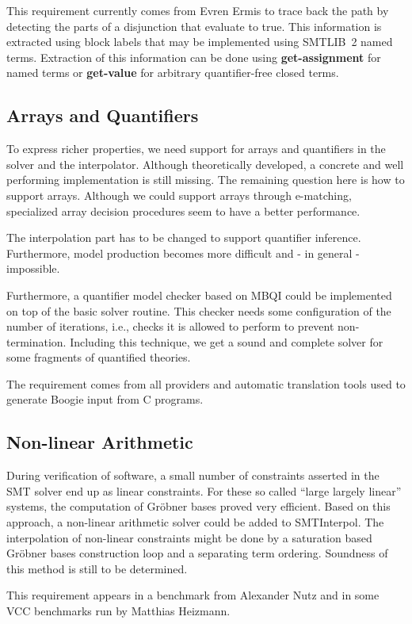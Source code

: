 \documentclass{article}
\newcommand\SI{SMTInterpol\xspace}
\begin{document}
This requirement currently comes from Evren Ermis to trace back the path by
detecting the parts of a disjunction that evaluate to true.  This information
is extracted using block labels that may be implemented using SMTLIB~2 named
terms.  Extraction of this information can be done using
\textbf{get-assignment} for named terms or \textbf{get-value} for arbitrary
quantifier-free closed terms.

\subsection{Arrays and Quantifiers}
To express richer properties, we need support for arrays and quantifiers in
the solver and the interpolator.  Although theoretically developed, a concrete
and well performing implementation is still missing.  The remaining question
here is how to support arrays.  Although we could support arrays through
e-matching, specialized array decision procedures seem to have a better
performance.

The interpolation part has to be changed to support quantifier inference.
Furthermore, model production becomes more difficult and - in general -
impossible.

Furthermore, a quantifier model checker based on MBQI could be implemented on
top of the basic solver routine.  This checker needs some configuration of the
number of iterations, i.e., checks it is allowed to perform to prevent
non-termination.  Including this technique, we get a sound and complete solver
for some fragments of quantified theories.

The requirement comes from all providers and automatic translation tools used
to generate Boogie input from C programs.

\subsection{Non-linear Arithmetic}
During verification of software, a small number of constraints asserted in the
SMT solver end up as linear constraints.  For these so called ``large largely
linear'' systems, the computation of Gr\"obner bases proved very efficient.
Based on this approach, a non-linear arithmetic solver could be added to \SI.
The interpolation of non-linear constraints might be done by a saturation
based Gr\"obner bases construction loop and a separating term ordering.
Soundness of this method is still to be determined.

This requirement appears in a benchmark from Alexander Nutz and in some VCC
benchmarks run by Matthias Heizmann.
\end{document}
